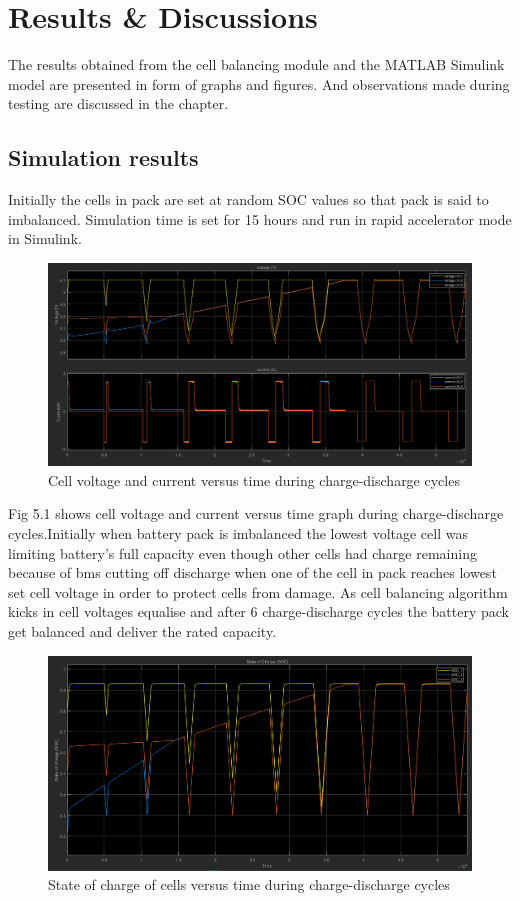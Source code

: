 \chapter{Results \& Discussions}
\indent The results obtained from the cell balancing module and the MATLAB Simulink model are presented in form of graphs and figures. And observations made during testing are discussed in the chapter.



\section{Simulation results}
Initially the cells in pack are set at random SOC values so that pack is said to imbalanced. Simulation time is set for 15 hours and run in rapid accelerator mode in Simulink.


\begin{figure}[h!]
    \centering
    \includegraphics[scale = 0.5]{Chapter5/Figures/cellsVI.png}
    \caption{Cell voltage and current versus time during charge-discharge cycles}
\end{figure}

Fig 5.1 shows cell voltage and current versus time graph during charge-discharge cycles.Initially when battery pack is imbalanced the lowest voltage cell was limiting battery's full capacity even though other cells had charge remaining because of \acrshort{bms} cutting off discharge when one of the cell in pack reaches lowest set cell voltage in order to protect cells from  damage. As cell balancing algorithm kicks in cell voltages equalise and after 6 charge-discharge cycles the battery pack get balanced and deliver the rated capacity.
\vspace{0.5cm}
\begin{figure}[h!]
    \centering
    \includegraphics[scale = 0.5]{Chapter5/Figures/soc.png}
    \caption{State of charge of cells versus time during charge-discharge cycles}
\end{figure}

